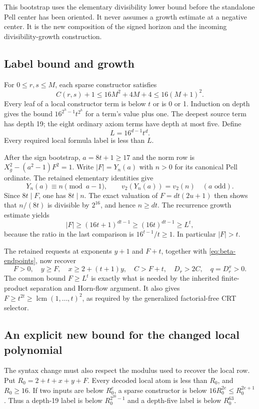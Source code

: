 \documentclass[11pt,letterpaper]{article}
\theoremstyle{remark}\newtheorem{remark}[theorem]{Remark}
\begin{document}
This bootstrap uses the elementary divisibility lower bound before the
standalone Pell center has been oriented. It never assumes a growth
estimate at a negative center. It is the new composition of the signed
horizon and the incoming divisibility-growth construction.

\subsection{Label bound and growth}

For $0\le r,s\le M$, each sparse constructor satisfies
\[
 C(r,s)+1\le16M^2+4M+4\le16(M+1)^2.
\]
Every leaf of a local constructor term is below $t$ or is 0 or 1.
Induction on depth gives the bound
$16^{2^h-1}t^{2^h}$ for a term's value plus one. The deepest source
term has depth 19; the eight ordinary axiom terms have depth at most
five. Define
\[
 L=16^{d-1}t^d.
\]
Every required local formula label is less than $L$.

After the sign bootstrap, $a=8t+1\ge17$ and the norm row is
$X_g^2-(a^2-1)F^2=1$. Write $|F|=Y_n(a)$ with $n>0$ for its canonical
Pell ordinate. The retained elementary identities give
\[
 Y_n(a)\equiv n\pmod{a-1},\qquad
 v_2(Y_n(a))=v_2(n)\quad(a\text{ odd}).
\]
Since $8t\mid F$, one has $8t\mid n$. The exact valuation of
$F=dt(2u+1)$ then shows that $n/(8t)$ is divisible by $2^{16}$,
and hence $n\ge dt$. The recurrence growth estimate yields
\[
 |F|\ge(16t+1)^{dt-1}\ge(16t)^{dt-1}\ge L^t,
\]
because the ratio in the last comparison is $16^{t-1}/t\ge1$.
In particular $|F|>t$.

The retained requests at exponents $y+1$ and $F+t$, together with
\eqref{eq:beta-endpoints}, now recover
\[
 F>0,\quad y\ge F,\quad x\ge2+(t+1)y,\quad C>F+t,
 \quad D_r>2C,\quad q=D_r^x>0.
\]
The common bound $F\ge L^t$ is exactly what is needed by the inherited
finite-product separation and Horn-flow argument. It also gives
$F\ge t^{2t}\ge\operatorname{lcm}(1,\ldots,t)^2$, as required by
the generalized factorial-free CRT selector.

\subsection{An explicit new bound for the changed local polynomial}

The syntax change must also respect the modulus used to recover the
local row. Put $R_0=2+t+x+y+F$. Every decoded local atom is less than
$R_0$, and $R_0\ge16$. If two inputs are below $R_0^e$, a sparse
constructor is below $16R_0^{2e}\le R_0^{2e+1}$. Thus a depth-19
label is below $R_0^{2^{20}-1}$ and a depth-five label is below
$R_0^{63}$.
\end{document}
